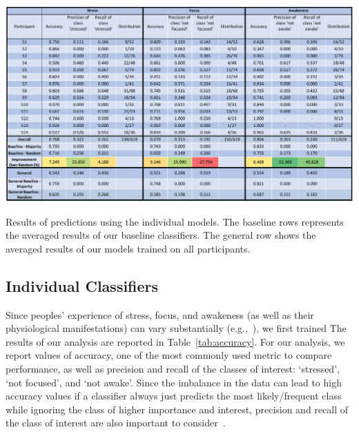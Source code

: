\begin{table}[h]
  \centering
  \includegraphics[width=1.0\textwidth]{rq1performance_v2.pdf}
  \caption{Results of predictions using the individual models.  The baseline rows represents the averaged results of our baseline classifiers. The general row shows the averaged results of our models trained on all participants.}\label{tab:accuracy}%
  \vspace*{-4mm}
\end{table}

\subsection{Individual Classifiers}
Since peoples' experience of stress, focus, and awakeness (as well as
their physiological manifestations) can vary substantially
(e.g.,~\cite{Hernandez11}), we first trained  The results of our analysis are reported in
Table~\ref{tab:accuracy}. For our analysis, we report values of
accuracy, one of the most commonly used metric to compare performance,
as well as precision and recall of the classes of interest:
`stressed', `not focused', and `not awake'. Since the imbalance in the
data can lead to high accuracy values if a classifier always just
predicts the most likely/frequent class while ignoring the class of
higher importance and interest, precision and recall of the class of
interest are also important to
consider~\cite{yap2014,bhattacharyya_data_2011,Hernandez11}.

